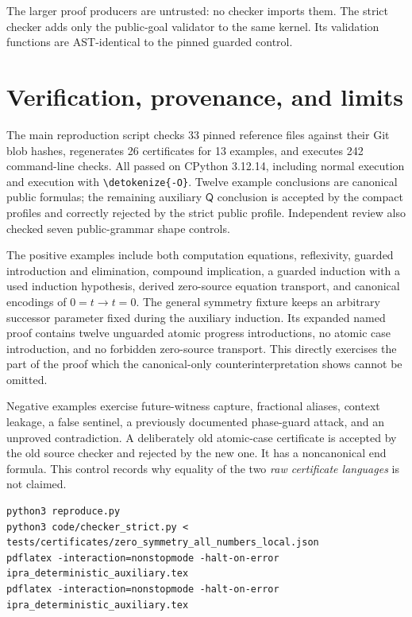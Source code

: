 \documentclass[11pt,letterpaper]{article}
\theoremstyle{definition}\newtheorem{definition}[theorem]{Definition}
\theoremstyle{remark}\newtheorem{remark}[theorem]{Remark}
\newcommand{\Q}{\mathsf Q}
\newcommand{\file}[1]{\expandafter\nolinkurl\expandafter{\detokenize{#1}}}
\begin{document}
The larger proof producers are untrusted: no checker imports them. The
strict checker adds only the public-goal validator to the same kernel.
Its validation functions are AST-identical to the pinned guarded control.

\section{Verification, provenance, and limits}

The main reproduction script checks 33 pinned reference files against
their Git blob hashes, regenerates 26 certificates for 13 examples, and
executes 242 command-line checks. All passed on CPython 3.12.14, including
normal execution and execution with \file{-O}. Twelve example conclusions
are canonical public formulas; the remaining auxiliary $\Q$ conclusion
is accepted by the compact profiles and correctly rejected by the strict
public profile. Independent review also checked seven public-grammar
shape controls.

The positive examples include both computation equations, reflexivity,
guarded introduction and elimination, compound implication, a guarded
induction with a used induction hypothesis, derived zero-source equation
transport, and canonical encodings of $0=t\to t=0$. The general symmetry
fixture keeps an arbitrary successor parameter fixed during the auxiliary
induction. Its expanded named proof contains twelve unguarded atomic
progress introductions, no atomic case introduction, and no forbidden
zero-source transport. This directly exercises the part of the proof
which the canonical-only counterinterpretation shows cannot be omitted.

Negative examples exercise future-witness capture, fractional aliases,
context leakage, a false sentinel, a previously documented phase-guard
attack, and an unproved contradiction. A deliberately old atomic-case
certificate is accepted by the old source checker and rejected by the new
one. It has a noncanonical end formula. This control records why equality
of the two \emph{raw certificate languages} is not claimed.

\begin{lstlisting}[language={}]
python3 reproduce.py
python3 code/checker_strict.py < tests/certificates/zero_symmetry_all_numbers_local.json
pdflatex -interaction=nonstopmode -halt-on-error ipra_deterministic_auxiliary.tex
pdflatex -interaction=nonstopmode -halt-on-error ipra_deterministic_auxiliary.tex
\end{lstlisting}
\end{document}
